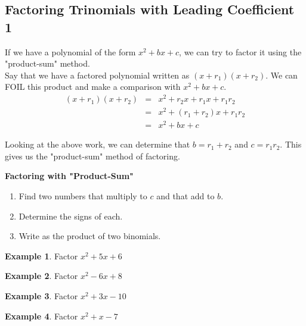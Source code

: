 \documentclass[addpoints,12pt]{exam}
\theoremstyle{definition}
\theoremstyle{break}
\theoremstyle{break}
\newtheorem{example}{Example}[subsection]
\begin{document}
\setcounter{section}{6}
\setcounter{subsection}{1}

\subsection{Factoring Trinomials with Leading Coefficient 1}

\vspace{.15in}
If we have a polynomial of the form $x^2 + bx + c$, we can try to factor it using the "product-sum" method.
\\
Say that we have a factored polynomial written as $(x+r_1)(x+r_2)$. We can FOIL this product and make a comparison with $x^2 + bx + c$.
\\
\begin{eqnarray*}
(x+r_1)(x+r_2) &=& x^2 + r_2x + r_1x + r_1r_2\\
&=& x^2 + (r_1+r_2)x + r_1r_2\\
&=& x^2 + bx + c
\end{eqnarray*}

Looking at the above work, we can determine that $b = r_1 + r_2$ and $c = r_1r_2$. This gives us the "product-sum" method of factoring.
\\
\begin{mdframed}
\textbf{Factoring with "Product-Sum"}
\begin{enumerate}
\item Find two numbers that multiply to $c$ and that add to $b$.
\item Determine the signs of each.
\item Write as the product of two binomials.
\end{enumerate}
\end{mdframed}

\vspace{.15in}

\begin{example}
Factor $x^2 + 5x + 6$
\vspace{1.25in}
\end{example}

\begin{example}
Factor $x^2 - 6x + 8$
\end{example}

\newpage

\begin{example}
Factor $x^2 + 3x - 10$
\vspace{1.25in}
\end{example}

\begin{example}
Factor $x^2 + x - 7$
\vspace{1.25in}
\end{example}
\end{document}
